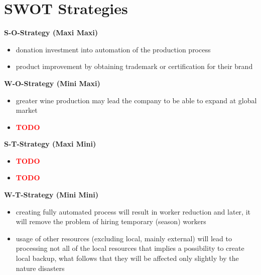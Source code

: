 \documentclass[11pt,a4paper]{article}
\newcommand{\TODO}{\textbf{\textcolor{red}{TODO}}} %
\begin{document}
\newpage

\section*{SWOT Strategies}

\begin{center}
    \begin{minipage}{0.95\textwidth}

        \textbf{S-O-Strategy (Maxi Maxi)}
        \begin{itemize}
            \item donation investment into automation of the production process
            \item product improvement by obtaining trademark or certification for their brand
        \end{itemize}

        \textbf{W-O-Strategy (Mini Maxi)}
        \begin{itemize}
            \item greater wine production may lead the company to be able to expand at global market
            \item \TODO
        \end{itemize}

        \textbf{S-T-Strategy (Maxi Mini)}
        \begin{itemize}
            \item \TODO
            \item \TODO
        \end{itemize}

        \textbf{W-T-Strategy (Mini Mini)}
        \begin{itemize}
            \item creating fully automated process will result in worker reduction and later, it will remove the problem of hiring temporary (season) workers
            \item usage of other resources (excluding local, mainly external) will lead to processing not all of the local resources that implies a possibility to create local backup, what follows that they will be affected only slightly by the nature disasters
        \end{itemize}

    \end{minipage}
\end{center}
\end{document}
